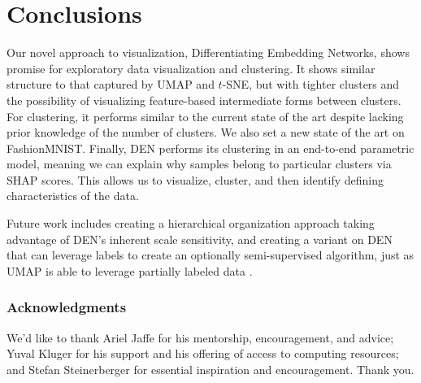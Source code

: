 \documentclass{article}
\begin{document}
\section{Conclusions}

Our novel approach to visualization, Differentiating Embedding Networks, shows promise for exploratory data visualization and clustering. It shows similar structure to that captured by UMAP and $t$-SNE, but with tighter clusters and the possibility of visualizing feature-based intermediate forms between clusters. For clustering, it performs similar to the current state of the art despite lacking prior knowledge of the number of clusters. We also set a new state of the art on FashionMNIST. Finally, DEN performs its clustering in an end-to-end parametric model, meaning we can explain why samples belong to particular clusters via SHAP scores. This allows us to visualize, cluster, and then identify defining characteristics of the data.

Future work includes creating a hierarchical organization approach taking advantage of DEN's inherent scale sensitivity, and creating a variant on DEN that can leverage labels to create an optionally semi-supervised algorithm, just as UMAP is able to leverage partially labeled data \cite{2018arXivUMAP}.

\clearpage

\pagebreak

\subsubsection*{Acknowledgments}

We'd like to thank Ariel Jaffe for his mentorship, encouragement, and advice; Yuval Kluger for his support and his offering of access to computing resources; and Stefan Steinerberger for essential inspiration and encouragement. Thank you.
\end{document}
